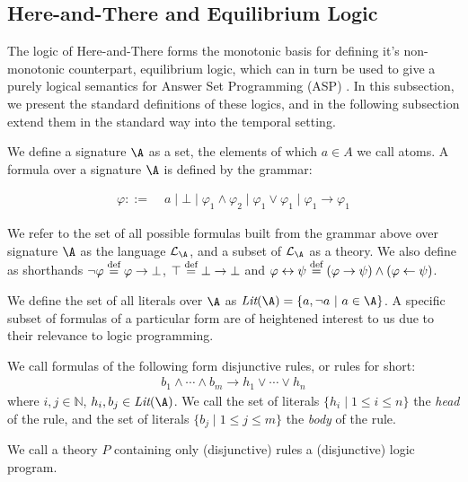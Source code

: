 \subsection{Here-and-There and Equilibrium Logic}

The logic of Here-and-There forms the monotonic basis for defining
it's non-monotonic counterpart, equilibrium logic, which can in turn
be used to give a purely logical semantics for Answer Set Programming
(ASP) \cite{pearce06a}. In this subsection, we present the standard
definitions of these logics, and in the following subsection extend
them in the standard way into the temporal setting.

We define a signature $\A$ as a set, the elements of which $a\in A$ we
call atoms. A formula over a signature $\A$ is defined by the grammar:

\begin{align*}
    \varphi ::= &\; a \mid \bot \mid
                  \varphi_1 \wedge \varphi_2 \mid
                  \varphi_1 \vee \varphi_1 \mid
                  \varphi_1 \to \varphi_1
\end{align*}

We refer to the set of all possible formulas built from the grammar
above over signature $\A$ as the language $\langa$, and a
subset of $\langa$ as a theory.  We also define as shorthands
$\neg \varphi \stackrel{\text{def}}{=} \varphi \to \bot$, $\top \stackrel{\text{def}}{=} \bot \to \bot$
and
$\varphi \leftrightarrow \psi \stackrel{\text{def}}{=} (\varphi \rightarrow \psi) \wedge
(\varphi \leftarrow \psi)$.

We define the set of all literals over $\A$ as
$\textit{Lit}(\A) = \{ a, \lnot a\ |\ a \in \A \}$.  A specific subset
of formulas of a particular form are of heightened interest to us due
to their relevance to logic programming.

\begin{definition}
    We call formulas of the following form disjunctive rules, or rules for short:
\begin{align*}
  b_{1} \wedge \cdots \wedge b_{m} \rightarrow h_1 \vee \cdots \vee h_{n}
\end{align*}
where $i,j \in \mathbb{N}$, $h_{i}, b_{j} \in \textit{Lit}(\A)$. We
call the set of literals $\{ h_i \mid 1 \leq i \leq n \}$ the
\emph{head} of the rule, and the set of literals
$\{ b_j \mid 1 \leq j \leq m \}$ the \emph{body} of the rule.
\end{definition}

We call a theory $P$ containing only (disjunctive) rules a
(disjunctive) logic program.

